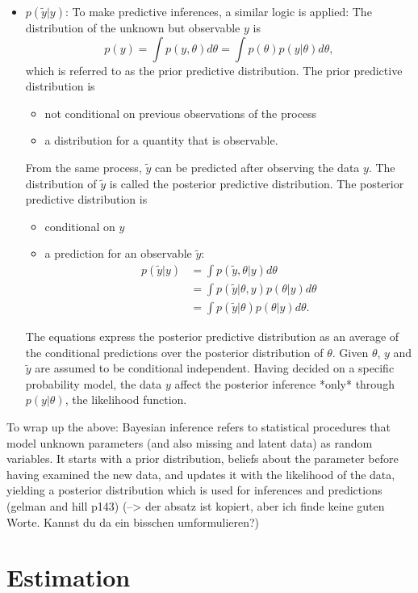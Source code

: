 \documentclass[a4, 12pt]{article}
\begin{document}
\begin{itemize}
\item $p(\tilde y|y)$:
To make predictive inferences, a similar logic is applied:
The distribution of the unknown but observable $y$ is
$$p(y)=\int p(y,\theta)d\theta=\int p(\theta)p(y|\theta)d\theta,$$ which is referred to as the prior predictive distribution. The prior predictive distribution is
\begin{itemize}
\item not conditional on previous observations of the process
\item a distribution for a quantity that is observable.
\end{itemize}
From the same process, $\tilde{y}$ can be predicted after observing the data $y$.
The distribution of $\tilde{y}$ is called the posterior predictive distribution. The posterior predictive distribution is
\begin{itemize}
\item conditional on $y$
\item a prediction for an observable $\tilde y:$
\begin{align*}
p(\tilde{y}|y) & =\int p(\tilde{y},\theta|y)d\theta \\
& = \int p(\tilde{y}|\theta,y)p(\theta|y)d\theta \\
& = \int p(\tilde{y}|\theta)p(\theta|y)d\theta.
\end{align*}
\end{itemize}
The equations express the posterior predictive distribution as an average of the conditional predictions over the posterior distribution of $\theta$. Given $\theta$, $y$ and $\tilde{y}$ are assumed to be conditional independent.
Having decided on a specific probability model, the data $y$ affect the posterior inference *only* through $p(y|\theta)$, the likelihood function.
\end{itemize}

To wrap up the above: Bayesian inference refers to statistical procedures that model unknown parameters (and also missing and latent data) as random variables. It starts with a prior distribution, beliefs about the parameter before having examined the new data, and updates it with the likelihood of the data, yielding a posterior distribution which is used for inferences and predictions (gelman and hill p143) (--\textgreater{} der absatz ist kopiert, aber ich finde keine guten Worte. Kannst du da ein bisschen umformulieren?)

\clearpage

\hypertarget{estimation}{%
\section{Estimation}\label{estimation}}
\end{document}
